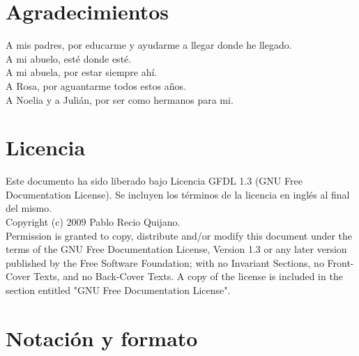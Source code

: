 

\section*{Agradecimientos}

A mis padres, por educarme y ayudarme a llegar donde he llegado.\\
A mi abuelo, esté donde esté.\\
A mi abuela, por estar siempre ahí.\\
A Rosa, por aguantarme todos estos años.\\
A Noelia y a Julián, por ser como hermanos para mi.

\cleardoublepage

\section*{Licencia} %

Este documento ha sido liberado bajo Licencia GFDL 1.3 (GNU Free
Documentation License). Se incluyen los términos de la licencia en
inglés al final del mismo.\\

Copyright (c) 2009 Pablo Recio Quijano.\\

Permission is granted to copy, distribute and/or modify this document under the
terms of the GNU Free Documentation License, Version 1.3 or any later version
published by the Free Software Foundation; with no Invariant Sections, no
Front-Cover Texts, and no Back-Cover Texts. A copy of the license is included in
the section entitled "GNU Free Documentation License".\\

\cleardoublepage

\section*{Notación y formato}

